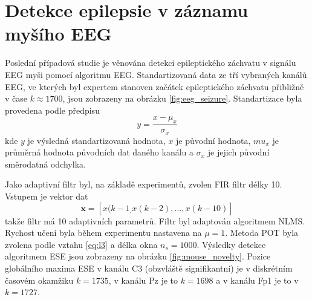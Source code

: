 \section{Detekce epilepsie v záznamu myšího EEG}\label{chap:mdpi_eeg}
Poslední případová studie je věnována detekci epileptického záchvatu v signálu EEG myši pomocí algoritmu EEG. Standartizovaná data ze tří vybraných kanálů EEG, ve kterých byl expertem stanoven začátek epileptického záchvatu přibližně v čase $k \approx 1700$, jsou zobrazeny na obrázku \ref{fig:eeg_seizure}. Standartizace byla provedena podle předpisu
\begin{equation}
y=\frac{x-\mu_{x}}{\sigma_{x}}
\end{equation}
kde $y$ je výsledná standartizovaná hodnota, $x$ je původní hodnota, $mu_x$ je průměrná hodnota původních dat daného kanálu a $\sigma_x$ je jejich původní směrodatná odchylka.
\par
Jako adaptivní filtr byl, na základě experimentů, zvolen FIR filtr délky 10. Vstupem je vektor dat
\begin{equation}
\textbf{x}=[x(k-1_,x(k-2),\dots,x(k-10)]
\end{equation}
takže filtr má 10 adaptivních parametrů. Filtr byl adaptován algoritmem NLMS. Rychost učení byla během experimentu nastavena na $\mu=1$. Metoda POT byla zvolena podle vztahu \ref{eq:l3} a délka okna $n_s=1000$. Výsledky detekce algoritmem ESE jsou zobrazeny na obrázku \ref{fig:mouse_novelty}. Pozice globálního maxima ESE v kanálu C3 (obzvláště signifikantní) je v diskrétním časovém okamžiku $k=1735$, v kanálu Pz je to  $k=1698$ a v kanálu Fp1 je to v $k=1727$. 

